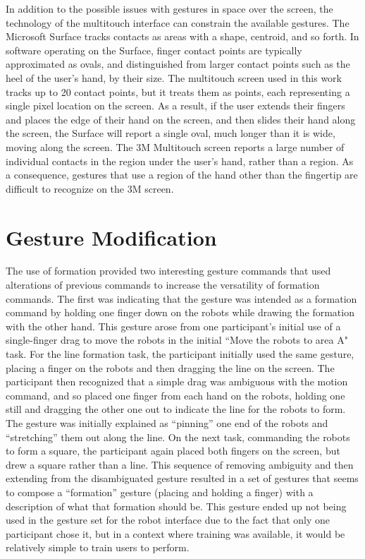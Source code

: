 In addition to the possible issues with gestures in space over the screen, the technology of the multitouch interface can constrain the available gestures. 
The Microsoft Surface tracks contacts as areas with a shape, centroid, and so forth. 
In software operating on the Surface, finger contact points are typically approximated as ovals, and distinguished from larger contact points such as the heel of the user's hand, by their size. 
The multitouch screen used in this work tracks up to 20 contact points, but it treats them as points, each representing a single pixel location on the screen. 
As a result, if the user extends their fingers and places the edge of their hand on the screen, and then slides their hand along the screen, the Surface will report a single oval, much longer than it is wide, moving along the screen. 
The 3M Multitouch screen reports a large number of individual contacts in the region under the user's hand, rather than a region.
As a consequence, gestures that use a region of the hand other than the fingertip are difficult to recognize on the 3M screen. 

\section{Gesture Modification}

The use of formation provided two interesting gesture commands that used alterations of previous commands to increase the versatility of formation commands. 
The first was indicating that the gesture was intended as a formation command by holding one finger down on the robots while drawing the formation with the other hand. 
This gesture arose from one participant's initial use of a single-finger drag to move the robots in the initial ``Move the robots to area A" task. 
For the line formation task, the participant initially used the same gesture, placing a finger on the robots and then dragging the line on the screen. 
The participant then recognized that a simple drag was ambiguous with the motion command, and so placed one finger from each hand on the robots, holding one still and dragging the other one out to indicate the line for the robots to form. 
The gesture was initially explained as ``pinning'' one end of the robots and ``stretching'' them out along the line.
On the next task, commanding the robots to form a square, the participant again placed both fingers on the screen, but drew a square rather than a line. 
This sequence of removing ambiguity and then extending from the disambiguated gesture resulted in a set of gestures that seems to compose a ``formation'' gesture (placing and holding a finger) with a description of what that formation should be. 
This gesture ended up not being used in the gesture set for the robot interface due to the fact that only one participant chose it, but in a context where training was available, it would be relatively simple to train users to perform. 

